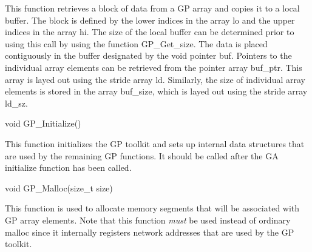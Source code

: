 \documentclass[12pt]{article}
\begin{document}
\begin{desc}

This function retrieves a block of data from a GP array and copies it to a local
buffer.  The block is defined by the lower indices in the array lo
and the upper indices in the array hi. The size of the local buffer can be
determined prior to using this call by using the function GP\_Get\_size. The
data is placed contiguously in the buffer designated by the void pointer buf.
Pointers to the individual array elements can be retrieved from the pointer
array buf\_ptr. This array is layed out using the stride array ld. Similarly,
the size of individual array elements is stored in the array buf\_size, which is
layed out using the stride array ld\_sz.

\end{desc}



\begin{capi}
\begin{ccode}
void GP\_Initialize()
\end{ccode}
\end{capi}

\local

\begin{desc}

This function initializes the GP toolkit and sets up internal data structures
that are used by the remaining GP functions. It should be called after the GA
initialize function has been called.

\end{desc}



\begin{capi}
\begin{ccode}
void GP\_Malloc(size\_t size)
\begin{funcargs}
\end{funcargs}
\end{ccode}
\end{capi}

\local

\begin{desc}

This function is used to allocate memory segments that will be associated with
GP array elements. Note that this function \emph{must} be used instead of
ordinary malloc since it internally registers network addresses that are used by
the GP toolkit.

\end{desc}
\end{document}
